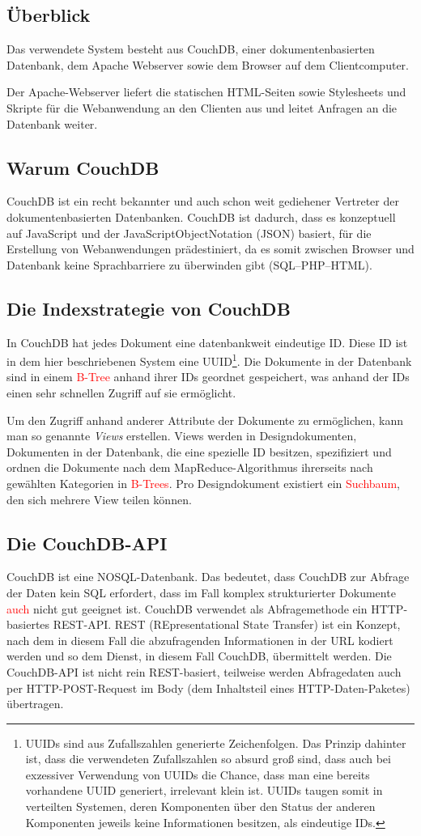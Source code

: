 \documentclass[12pt,ngerman,a4]{scrartcl}
\newcommand{\pquote}[1]{\glqq #1\grqq}
\newcommand{\annot}[1]{{\textcolor{red}{#1}}}%
\begin{document}
\subsection{Überblick}
Das verwendete System besteht aus CouchDB, einer dokumentenbasierten Datenbank, dem Apache Webserver sowie dem Browser auf dem Clientcomputer.

Der Apache-Webserver liefert die statischen HTML-Seiten sowie Stylesheets und Skripte für die Webanwendung an den Clienten aus und leitet Anfragen an die Datenbank weiter.
\subsection{Warum CouchDB}
CouchDB ist ein recht bekannter und auch schon weit gediehener Vertreter der dokumentenbasierten Datenbanken. CouchDB ist dadurch, dass es konzeptuell auf JavaScript und der JavaScriptObjectNotation (JSON) basiert, für die Erstellung von Webanwendungen prädestiniert, da es somit zwischen Browser und Datenbank keine \pquote{Sprachbarriere} zu überwinden gibt (SQL--PHP--HTML).
\subsection{Die Indexstrategie von CouchDB}
In CouchDB hat jedes Dokument eine datenbankweit eindeutige ID. Diese ID ist in dem hier beschriebenen System eine UUID\footnote{UUIDs sind aus Zufallszahlen generierte Zeichenfolgen. Das Prinzip dahinter ist, dass die verwendeten Zufallszahlen so absurd groß sind, dass auch bei exzessiver Verwendung von UUIDs die Chance, dass man eine bereits vorhandene UUID generiert, irrelevant klein ist. UUIDs taugen somit in verteilten Systemen, deren Komponenten über den Status der anderen Komponenten jeweils keine Informationen besitzen, als eindeutige IDs.}. Die Dokumente in der Datenbank sind in einem \annot{B-Tree} anhand ihrer IDs geordnet gespeichert, was anhand der IDs einen sehr schnellen Zugriff auf sie ermöglicht.

Um den Zugriff anhand anderer Attribute der Dokumente zu ermöglichen, kann man so genannte \emph{Views} erstellen. Views werden in Designdokumenten, Dokumenten in der Datenbank, die eine spezielle ID besitzen, spezifiziert und ordnen die Dokumente nach dem MapReduce-Algorithmus %
ihrerseits nach gewählten Kategorien in \annot{B-Trees}. Pro Designdokument existiert ein \annot{Suchbaum}, den sich mehrere View teilen können.
\subsection{Die CouchDB-API}
CouchDB ist eine NOSQL-Datenbank. Das bedeutet, dass CouchDB zur Abfrage der Daten kein SQL erfordert, dass im Fall komplex strukturierter Dokumente \annot{auch} nicht gut geeignet ist. CouchDB verwendet als Abfragemethode ein HTTP-basiertes REST-API. REST (REpresentational State Transfer) ist ein Konzept, nach dem in diesem Fall die abzufragenden Informationen in der URL kodiert werden und so dem Dienst, in diesem Fall CouchDB, übermittelt werden. Die CouchDB-API ist nicht rein REST-basiert, teilweise werden Abfragedaten auch per HTTP-POST-Request im Body (dem Inhaltsteil eines HTTP-Daten-\pquote{Paketes}) übertragen.
\end{document}
